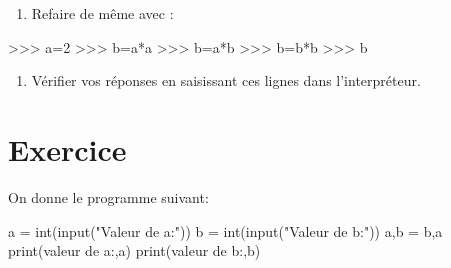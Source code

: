 \documentclass[11pt]{article}
\providecommand{\tightlist}{%
      \setlength{\itemsep}{0pt}\setlength{\parskip}{0pt}}
\newenvironment{Shaded}{}{}
\newcommand{\DecValTok}[1]{\textcolor[rgb]{0.25,0.63,0.44}{{#1}}}
\newcommand{\StringTok}[1]{\textcolor[rgb]{0.25,0.44,0.63}{{#1}}}
\newcommand{\NormalTok}[1]{{#1}}
\newcommand{\OperatorTok}[1]{\textcolor[rgb]{0.40,0.40,0.40}{{#1}}}
\newcommand{\BuiltInTok}[1]{{#1}}
\begin{document}
\begin{enumerate}
\def\labelenumi{\arabic{enumi}.}
\setcounter{enumi}{1}
\tightlist
\item
  Refaire de même avec :
\end{enumerate}

\begin{Shaded}
\begin{Highlighting}[]
\OperatorTok{\textgreater{}\textgreater{}\textgreater{}}\NormalTok{ a}\OperatorTok{=}\DecValTok{2}
\OperatorTok{\textgreater{}\textgreater{}\textgreater{}}\NormalTok{ b}\OperatorTok{=}\NormalTok{a}\OperatorTok{*}\NormalTok{a}
\OperatorTok{\textgreater{}\textgreater{}\textgreater{}}\NormalTok{ b}\OperatorTok{=}\NormalTok{a}\OperatorTok{*}\NormalTok{b}
\OperatorTok{\textgreater{}\textgreater{}\textgreater{}}\NormalTok{ b}\OperatorTok{=}\NormalTok{b}\OperatorTok{*}\NormalTok{b}
\OperatorTok{\textgreater{}\textgreater{}\textgreater{}}\NormalTok{ b}
\end{Highlighting}
\end{Shaded}

\begin{enumerate}
\def\labelenumi{\arabic{enumi}.}
\setcounter{enumi}{2}
\tightlist
\item
  Vérifier vos réponses en saisissant ces lignes dans l'interpréteur.
\end{enumerate}

    \hypertarget{exercice}{%
\section{Exercice}\label{exercice}}

On donne le programme suivant:

\begin{Shaded}
\begin{Highlighting}[]
\NormalTok{a }\OperatorTok{=} \BuiltInTok{int}\NormalTok{(}\BuiltInTok{input}\NormalTok{(}\StringTok{"Valeur de a:"}\NormalTok{))}
\NormalTok{b }\OperatorTok{=} \BuiltInTok{int}\NormalTok{(}\BuiltInTok{input}\NormalTok{(}\StringTok{"Valeur de b:"}\NormalTok{))}
\NormalTok{a,b }\OperatorTok{=}\NormalTok{ b,a}
\BuiltInTok{print}\NormalTok{(}\StringTok{\textquotesingle{}valeur de a:\textquotesingle{}}\NormalTok{,a)}
\BuiltInTok{print}\NormalTok{(}\StringTok{\textquotesingle{}valeur de b:\textquotesingle{}}\NormalTok{,b)}
\end{Highlighting}
\end{Shaded}
\end{document}
